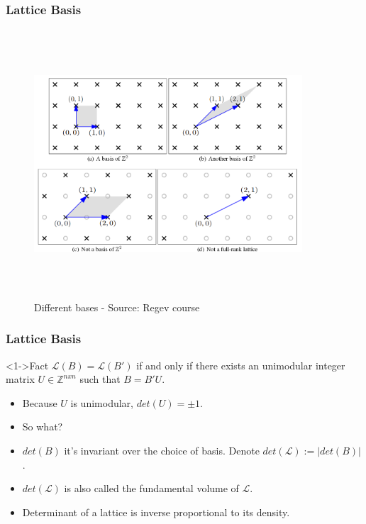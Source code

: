 \documentclass{beamer}
\begin{document}

\begin{frame}
    \frametitle{Lattice Basis}
    \begin{figure}
            \includegraphics[width=10cm,height=10cm,keepaspectratio]{img/lattice_bases.png}
            \caption{Different bases - Source: Regev course}
        \end{figure}
\end{frame}
\begin{frame}
    \frametitle{Lattice Basis}
    \begin{block}<1->{Fact}
        $\mathcal{L}(B) = \mathcal{L}(B')$ if and only if there exists an unimodular integer matrix $U \in \mathbb{Z}^{nxn}$ such that $B = B'U$.
    \end{block} 
    \begin{itemize}
        \pause \item Because $U$ is unimodular, $det(U) = \pm 1$.
        \pause \item So what?
        \pause \item $det(B)$ it's invariant over the choice of basis. Denote $det(\mathcal{L}) := |det(B)|$.
        \pause \item $det(\mathcal{L})$ is also called the fundamental volume of $\mathcal{L}$.
        \pause \item Determinant of a lattice is inverse proportional to its density.
    \end{itemize}
\end{frame}
\end{document}
